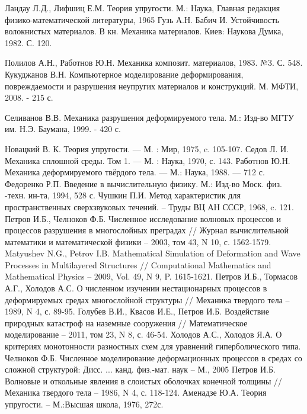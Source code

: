 \begin{thebibliography}{99}
Ландау Л.Д., Лифшиц Е.М. Теория упругости. М.: Наука, Главная редакция физико-математической литературы, 1965
Гузь А.Н. Бабич И. Устойчивость волокнистых материалов. В кн. Механика материалов. Киев: Наукова Думка, 1982. С. 120.

Полилов А.Н., Работнов Ю.Н. Механика композит. материалов, 1983. №3. С. 548.
Кукуджанов В.Н. Компьютерное моделирование деформирования, повреждаемости и разрушения неупругих материалов и конструкций. М. МФТИ, 2008. - 215 с.

Селиванов В.В. Механика разрушения деформируемого тела. М.: Изд-во МГТУ им. Н.Э. Баумана, 1999. - 420 с.

Новацкий В. К. Теория упругости. — М. : Мир, 1975, c. 105-107.
Седов Л. И. Механика сплошной среды. Том 1. — М. : Наука, 1970, с. 143.
Работнов Ю.Н. Механика деформируемого твёрдого тела. — М.: Наука, 1988. — 712 с.
Федоренко Р.П. Введение в вычислительную физику. М.:
Изд-во Моск. физ. -техн. ин-та, 1994, 528 с.
Чушкин П.И. Метод характеристик для пространственных сверхзвуковых течений. –  Труды ВЦ АН СССР, 1968, c. 121.
Петров И.Б., Челноков Ф.Б. Численное исследование волновых процессов и процессов разрушения в многослойных преградах // Журнал вычислительной математики и математической физики – 2003, том 43, N 10, с. 1562-1579.
Matyushev N.G., Petrov I.B. Mathematical Simulation of Deformation and Wave Processes in Multilayered Structures // Computational Mathematics and Mathematical Physics – 2009, Vol. 49, N 9, P. 1615-1621.
Петров  И.Б., Тормасов А.Г., Холодов А.С. О численном изучении нестационарных процессов в деформируемых средах многослойной структуры // Механика твердого тела – 1989, N 4, с. 89-95.
Голубев В.И., Квасов И.Е., Петров И.Б. Воздействие природных катастроф на наземные сооружения // Математическое моделирование – 2011, том 23, N 8, с. 46-54.
Холодов А.С., Холодов Я.А. О критериях монотонности разностных
схем для уравнений гиперболического типа. 
Челноков Ф.Б. Численное моделирование деформационных процессов в средах со сложной структурой: Дисс. ... канд. физ.-мат. наук – М., 2005
Петров И.Б. Волновые и откольные явления в слоистых оболочках конечной толщины // Механика твердого тела – 1986, N 4, с. 118-124.
Аменадзе Ю.А. Теория упругости. – М.:Высшая школа, 1976, 272с.

\end{thebibliography}

